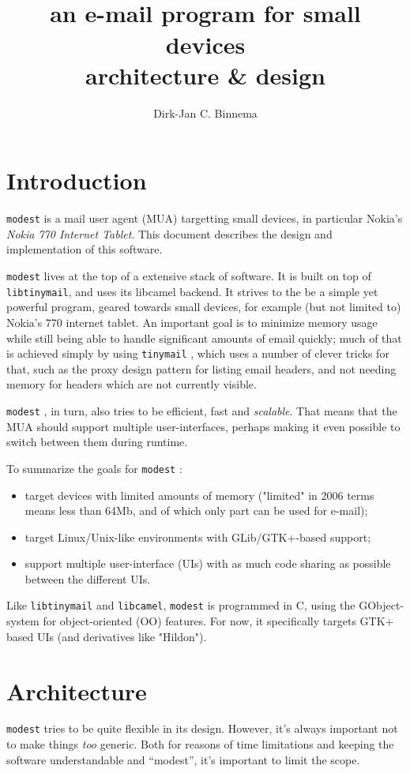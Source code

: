 \documentclass{book}
\author{Dirk-Jan C. Binnema\\\djcbemail}
\title{{\huge \modest}\\
an e-mail program for small devices\\
architecture \& design}
\newcommand{\modest}{{\tt modest} }
\newcommand{\tinymail}{{\tt tinymail} }
\newcommand{\gtk}{{\sc GTK+} }
\begin{document}
\maketitle
\tableofcontents
\chapter*{Introduction}
\modest is a mail user agent (MUA) targetting small devices, in particular
Nokia's {\em Nokia 770 Internet Tablet}. This document describes the design
and implementation of this software.

\modest lives at the top of a extensive stack of software. It is built on
top of {\tt libtinymail}, and uses its libcamel backend. It strives to the be
a simple yet powerful program, geared towards small devices, for example (but
not limited to) Nokia's 770 internet tablet. An important goal is to minimize
memory usage while still being able to handle significant amounts of email
quickly; much of that is achieved simply by using \tinymail, which
uses a number of clever tricks for that, such as the proxy design pattern for
listing email headers, and not needing memory for headers which are not
currently visible.

\modest, in turn, also tries to be efficient, fast and {\em scalable}. That
means that the MUA should support multiple user-interfaces, perhaps making it
even possible to switch between them during runtime. 

To summarize the goals for \modest:
\begin{itemize}
\item target devices with limited amounts of memory ("limited" in 2006 terms means
  less than 64Mb, and of which only part can be used for e-mail);
\item target Linux/Unix-like environments with GLib/GTK+-based support;
\item support multiple user-interface (UIs) with as
  much code sharing as possible between the different UIs.
\end{itemize}

Like {\tt libtinymail} and {\tt libcamel}, \modest is programmed in C, using the
GObject-system for object-oriented (OO) features. For now, it specifically
targets \gtk based UIs (and derivatives like "Hildon"). 

\chapter{Architecture}
\modest tries to be quite flexible in its design. However, it's always
important not to make things {\em too} generic. Both for reasons of time
limitations and keeping the software understandable and ``modest'', it's
important to limit the scope.
\end{document}
